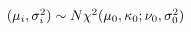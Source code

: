\documentclass[10pt]{article}
\begin{document}
$(\mu_{i}, \sigma_{i}^{2}) \sim N \chi^2(\mu_{0},\kappa_{0}; \nu_{0}, \sigma_{0}^{2}) \\




$
\end{document}
